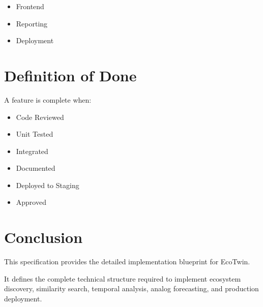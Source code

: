 \documentclass[11pt,a4paper]{article}
\begin{document}
\begin{itemize}
\item Frontend
\item Reporting
\item Deployment
\end{itemize}

\section{Definition of Done}

A feature is complete when:

\begin{itemize}
\item Code Reviewed
\item Unit Tested
\item Integrated
\item Documented
\item Deployed to Staging
\item Approved
\end{itemize}

\section{Conclusion}

This specification provides the detailed
implementation blueprint for EcoTwin.

It defines the complete technical structure
required to implement ecosystem discovery,
similarity search, temporal analysis,
analog forecasting, and production deployment.
\end{document}
